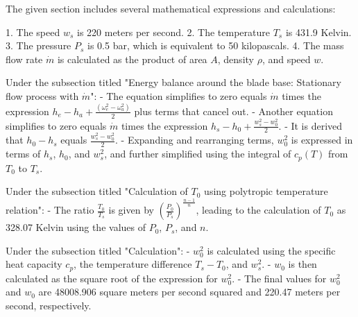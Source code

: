 The given section includes several mathematical expressions and calculations:

1. The speed \( w_s \) is 220 meters per second.
2. The temperature \( T_s \) is 431.9 Kelvin.
3. The pressure \( P_s \) is 0.5 bar, which is equivalent to 50 kilopascals.
4. The mass flow rate \( \dot{m} \) is calculated as the product of area \( A \), density \( \rho \), and speed \( w \).

Under the subsection titled "Energy balance around the blade base: Stationary flow process with \( \dot{m} \)":
- The equation simplifies to zero equals \( \dot{m} \) times the expression \( h_e - h_a + \frac{(\omega_e^2 - \omega_a^2)}{2} \) plus terms that cancel out.
- Another equation simplifies to zero equals \( \dot{m} \) times the expression \( h_s - h_0 + \frac{w_s^2 - w_0^2}{2} \).
- It is derived that \( h_0 - h_s \) equals \( \frac{w_s^2 - w_0^2}{2} \).
- Expanding and rearranging terms, \( w_0^2 \) is expressed in terms of \( h_s \), \( h_0 \), and \( w_s^2 \), and further simplified using the integral of \( c_p(T) \) from \( T_0 \) to \( T_s \).

Under the subsection titled "Calculation of \( T_0 \) using polytropic temperature relation":
- The ratio \( \frac{T_0}{T_s} \) is given by \( \left( \frac{P_0}{P_s} \right)^{\frac{n-1}{n}} \), leading to the calculation of \( T_0 \) as 328.07 Kelvin using the values of \( P_0 \), \( P_s \), and \( n \).

Under the subsection titled "Calculation":
- \( w_0^2 \) is calculated using the specific heat capacity \( c_p \), the temperature difference \( T_s - T_0 \), and \( w_s^2 \).
- \( w_0 \) is then calculated as the square root of the expression for \( w_0^2 \).
- The final values for \( w_0^2 \) and \( w_0 \) are 48008.906 square meters per second squared and 220.47 meters per second, respectively.